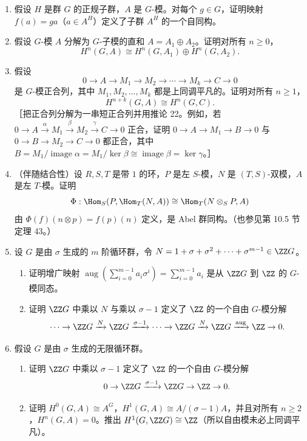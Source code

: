 \begin{enumerate}[label=\arabic*.]
  \item 假设 $H$ 是群 $G$ 的正规子群，$A$ 是 $G$-模。对每个 $g\in G$，证明映射 $f(a)=ga$（$a\in A^H$）定义了子群 $A^H$ 的一个自同构。

  \item 假设 $G$-模 $A$ 分解为 $G$-子模的直和 $A=A_1\oplus A_2$。证明对所有 $n\geq0$，
  \[
    H^n(G,A)\cong H^n(G,A_1)\oplus H^n(G,A_2).
  \]

  \item 假设
  \[
    0\to A\to M_1\to M_2\to\cdots\to M_k\to C\to0
  \]
  是 $G$-模正合列，其中 $M_1,M_2,
  \ldots,M_k$ 都是上同调平凡的。证明对所有 $n\geq1$，
  \[
    H^{n+k}(G,A)\cong H^n(G,C).
  \]
  ［把正合列分解为一串短正合列并用推论 22。例如，若 $0\to A\xrightarrow{\alpha}M_1\xrightarrow{\beta}M_2\xrightarrow{\gamma}C\to0$ 正合，证明 $0\to A\to M_1\to B\to0$ 与 $0\to B\to M_2\to C\to0$ 都正合，其中 $B=M_1/\operatorname{image}\alpha=M_1/\ker\beta\cong\operatorname{image}\beta=\ker\gamma$。］

  \item （伴随结合性）设 $R,S,T$ 是带 $1$ 的环，$P$ 是左 $S$-模，$N$ 是 $(T,S)$-双模，$A$ 是左 $T$-模。证明
  \[
    \Phi:\Hom_S(P,\Hom_T(N,A))\cong\Hom_T(N\otimes_SP,A)
  \]
  由 $\Phi(f)(n\otimes p)=f(p)(n)$ 定义，是 Abel 群同构。（也参见第 10.5 节定理 43。）

  \item 设 $G$ 是由 $\sigma$ 生成的 $m$ 阶循环群，令 $N=1+\sigma+\sigma^2+\cdots+\sigma^{m-1}\in\ZZ G$。
  \begin{enumerate}[label=(\alph*)]
    \item 证明增广映射 $\operatorname{aug}(\sum_{i=0}^{m-1}a_i\sigma^i)=\sum_{i=0}^{m-1}a_i$ 是从 $\ZZ G$ 到 $\ZZ$ 的 $G$-模同态。
    \item 证明 $\ZZ G$ 中乘以 $N$ 与乘以 $\sigma-1$ 定义了 $\ZZ$ 的一个自由 $G$-模分解
    \[
      \cdots\to\ZZ G\xrightarrow{N}\ZZ G\xrightarrow{\sigma-1}\cdots\to\ZZ G\xrightarrow{N}\ZZ G\xrightarrow{\operatorname{aug}}\ZZ\to0.
    \]
  \end{enumerate}

  \item 假设 $G$ 是由 $\sigma$ 生成的无限循环群。
  \begin{enumerate}[label=(\alph*)]
    \item 证明 $\ZZ G$ 中乘以 $\sigma-1$ 定义了 $\ZZ$ 的一个自由 $G$-模分解
    \[
      0\to\ZZ G\xrightarrow{\sigma-1}\ZZ G\to\ZZ\to0.
    \]
    \item 证明 $H^0(G,A)\cong A^G$，$H^1(G,A)\cong A/(\sigma-1)A$，并且对所有 $n\geq2$，$H^n(G,A)=0$。推出 $H^1(G,\ZZ G)\cong\ZZ$（所以自由模未必上同调平凡）。
  \end{enumerate}


\end{enumerate}
